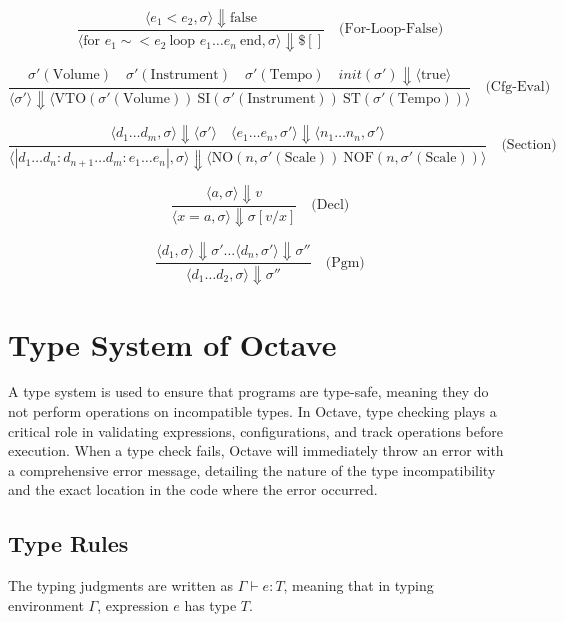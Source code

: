 \documentclass[letterpaper,12pt]{article}
\begin{document}
    \[
    \frac{\langle e_1 < e_2, \sigma \rangle \Downarrow \text{false}}{\langle 
        \text{for } e_1 \sim< e_2 \ \text{loop } e_1 \dots e_n \ \text{end}, \sigma \rangle \Downarrow \$[] } \quad \text{(For-Loop-False)}
    \]
    
    \[
    \frac{\sigma'(\text{Volume}) \quad \sigma'(\text{Instrument}) \quad \sigma'(\text{Tempo}) \quad init(\sigma') \Downarrow \langle \text{true} \rangle}{\langle \sigma' \rangle \Downarrow \langle \text{VTO}(\sigma'(\text{Volume}))\ \text{SI}(\sigma'(\text{Instrument}))\ \text{ST}(\sigma'(\text{Tempo})) \rangle} \quad \text{(Cfg-Eval)}
    \]

    \[
    \frac{\langle d_1 \dots d_m, \sigma \rangle \Downarrow \langle \sigma' \rangle \quad \langle e_1 \dots e_n, \sigma' \rangle \Downarrow \langle n_1 \dots n_n , \sigma' \rangle}{\langle |d_1 \dots d_n:d_{n+1} \dots d_m:e_1 \dots e_n|, \sigma\rangle \Downarrow \langle 
    \text{NO}(n, \sigma'(\text{Scale}))\
    \text{NOF}(n, \sigma'(\text{Scale}))
    \rangle} \quad \text{(Section)}
    \]

    \[
    \frac{\langle a, \sigma \rangle \Downarrow v}{\langle x = a, \sigma \rangle \Downarrow \sigma[v/x]} \quad \text{(Decl)}
    \]

    \[
    \frac{\langle d_1, \sigma \rangle \Downarrow \sigma' \dots \langle d_n, \sigma' \rangle \Downarrow \sigma''}{\langle d_1 \dots d_2, \sigma \rangle \Downarrow \sigma''} \quad \text{(Pgm)}
    \]
    

\section{Type System of Octave}

A type system is used to ensure that programs are type-safe, 
meaning they do not perform operations on incompatible types.
 In Octave, type checking plays a critical role in validating expressions, 
 configurations, and track operations before execution. When a type check fails, 
 Octave will immediately throw an error with a comprehensive error message, 
 detailing the nature of the type incompatibility and the exact location in the code where the
  error occurred. 

\subsection{Type Rules}

The typing judgments are written as \(\Gamma \vdash e : T\), meaning that in typing environment \(\Gamma\), expression \(e\) has type \(T\).
\end{document}
